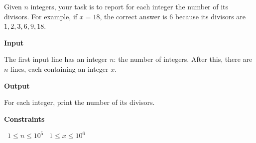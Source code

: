 Given $n$ integers, your task is to report for each integer the number of its divisors.
For example, if $x=18$, the correct answer is $6$ because its divisors are $1,2,3,6,9,18$.

\vspace{0.3cm}\noindent\textbf{Input}

The first input line has an integer $n$: the number of integers.
After this, there are $n$ lines, each containing an integer $x$.

\vspace{0.3cm}\noindent\textbf{Output}

For each integer, print the number of its divisors.

\vspace{0.3cm}\noindent\textbf{Constraints}

\textbullet\ $1 \le n \le 10^5$
\textbullet\ $1 \le x \le 10^6$